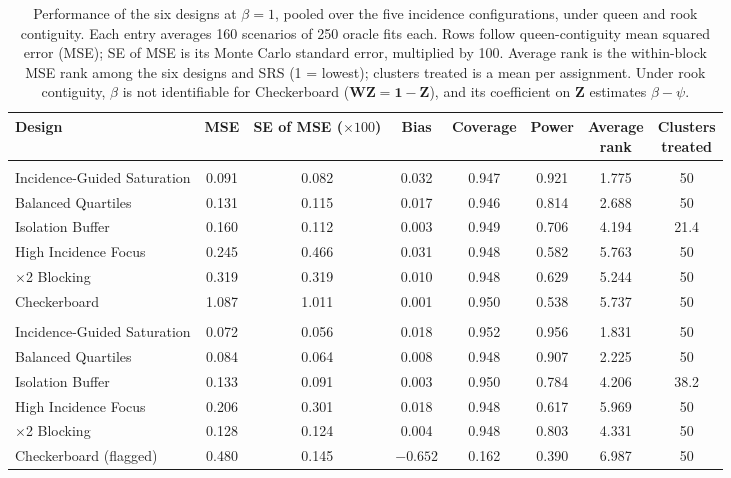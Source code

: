 \documentclass[11pt]{article}
\begin{document}
\iffullsi
\begin{table}[!htb]

\small
\centering

\caption{Performance of the six designs at $\beta = 1$, pooled over the five incidence configurations, under queen and rook contiguity. Each entry averages 160 scenarios of 250 oracle fits each. Rows follow queen-contiguity mean squared error (MSE); SE of MSE is its Monte Carlo standard error, multiplied by 100. Average rank is the within-block MSE rank among the six designs and SRS (1 = lowest); clusters treated is a mean per assignment. Under rook contiguity, $\beta$ is not identifiable for Checkerboard ($\mathbf{W}\mathbf{Z} = \mathbf{1} - \mathbf{Z}$), and its coefficient on $\mathbf{Z}$ estimates $\beta - \psi$.}
\label{tab:performance}

\begin{tabular}{>{\raggedright\arraybackslash}p{4.0cm}ccccccc}

\toprule
Design & MSE & \shortstack{SE of MSE\\($\times 100$)} & Bias & Coverage & Power & \shortstack{Average\\rank} & \shortstack{Clusters\\treated} \\

\midrule
\multicolumn{8}{l}{\textit{Queen contiguity (primary)}} \\
Incidence-Guided Saturation & 0.091 & 0.082 & 0.032 & 0.947 & 0.921 & 1.775 & 50 \\
Balanced Quartiles & 0.131 & 0.115 & 0.017 & 0.946 & 0.814 & 2.688 & 50 \\
Isolation Buffer & 0.160 & 0.112 & 0.003 & 0.949 & 0.706 & 4.194 & 21.4 \\
High Incidence Focus & 0.245 & 0.466 & 0.031 & 0.948 & 0.582 & 5.763 & 50 \\
2$\times$2 Blocking & 0.319 & 0.319 & 0.010 & 0.948 & 0.629 & 5.244 & 50 \\
Checkerboard & 1.087 & 1.011 & 0.001 & 0.950 & 0.538 & 5.737 & 50 \\

\midrule
\multicolumn{8}{l}{\textit{Rook contiguity (sensitivity)}} \\
Incidence-Guided Saturation & 0.072 & 0.056 & 0.018 & 0.952 & 0.956 & 1.831 & 50 \\
Balanced Quartiles & 0.084 & 0.064 & 0.008 & 0.948 & 0.907 & 2.225 & 50 \\
Isolation Buffer & 0.133 & 0.091 & 0.003 & 0.950 & 0.784 & 4.206 & 38.2 \\
High Incidence Focus & 0.206 & 0.301 & 0.018 & 0.948 & 0.617 & 5.969 & 50 \\
2$\times$2 Blocking & 0.128 & 0.124 & 0.004 & 0.948 & 0.803 & 4.331 & 50 \\
Checkerboard (flagged) & 0.480 & 0.145 & $-0.652$ & 0.162 & 0.390 & 6.987 & 50 \\

\bottomrule

\end{tabular}

\end{table}
\end{document}
